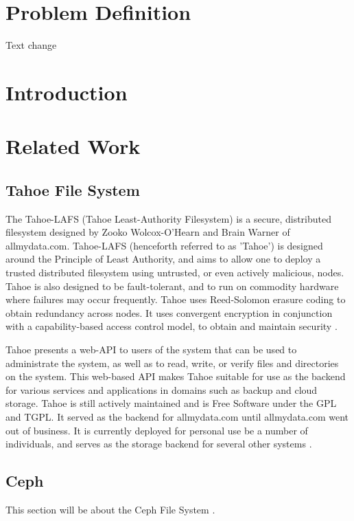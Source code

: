 \documentclass[11pt]{article}
\begin{document}
\newpage

\section{Problem Definition}
Text change

\section{Introduction}


\section{Related Work}
\subsection{Tahoe File System}

The Tahoe-LAFS (Tahoe Least-Authority Filesystem) is a secure,
distributed filesystem designed by Zooko Wolcox-O'Hearn and Brain
Warner of allmydata.com. Tahoe-LAFS (henceforth referred to as
'Tahoe') is designed around the Principle of Least Authority, and aims
to allow one to deploy a trusted distributed filesystem using
untrusted, or even actively malicious, nodes. Tahoe is also designed
to be fault-tolerant, and to run on commodity hardware where failures
may occur frequently. Tahoe uses Reed-Solomon erasure coding to obtain
redundancy across nodes. It uses convergent encryption in conjunction
with a capability-based access control model, to obtain and maintain
security \cite{WilcoxOHearn:2008p1275}.

Tahoe presents a web-API to users of the system that can be used to
administrate the system, as well as to read, write, or verify files
and directories on the system. This web-based API makes Tahoe suitable
for use as the backend for various services and applications in
domains such as backup and cloud storage. Tahoe is still actively
maintained and is Free Software under the GPL and TGPL. It served as the
backend for allmydata.com until allmydata.com went out of business. It
is currently deployed for personal use be a number of individuals, and
serves as the storage backend for several other
systems \cite{tahoe-lafs.org}. 

\subsection{Ceph}
This section will be about the Ceph File System
\cite{Weil:2012p1035,Weil:2012p1010,Weil:2006p1273}.

\nocite{*}

\end{document}
